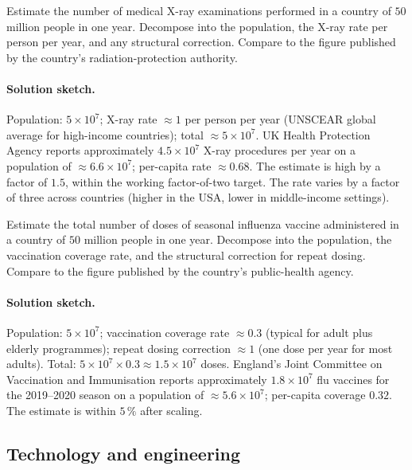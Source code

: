 \begin{exercise}
Estimate the number of medical X-ray examinations performed in a
country of $50$ million people in one year. Decompose into the
population, the X-ray rate per person per year, and any structural
correction. Compare to the figure published by the country's
radiation-protection authority.
\end{exercise}

\paragraph{Solution sketch.}
Population: $5 \times 10^{7}$; X-ray rate $\approx 1$ per person
per year (UNSCEAR global average for high-income countries); total
$\approx 5 \times 10^{7}$. UK Health Protection Agency reports
approximately $4.5 \times 10^{7}$ X-ray procedures per year on a
population of $\approx 6.6 \times 10^{7}$; per-capita rate
$\approx 0.68$. The estimate is high by a factor of $1.5$, within
the working factor-of-two target. The rate varies by a factor of
three across countries (higher in the USA, lower in middle-income
settings).

\begin{exercise}
Estimate the total number of doses of seasonal influenza vaccine
administered in a country of $50$ million people in one year.
Decompose into the population, the vaccination coverage rate, and
the structural correction for repeat dosing. Compare to the figure
published by the country's public-health agency.
\end{exercise}

\paragraph{Solution sketch.}
Population: $5 \times 10^{7}$; vaccination coverage rate $\approx
0.3$ (typical for adult plus elderly programmes); repeat dosing
correction $\approx 1$ (one dose per year for most adults). Total:
$5 \times 10^{7} \times 0.3 \approx 1.5 \times 10^{7}$ doses.
England's Joint Committee on Vaccination and Immunisation reports
approximately $1.8 \times 10^{7}$ flu vaccines for the 2019--2020
season on a population of $\approx 5.6 \times 10^{7}$; per-capita
coverage $0.32$. The estimate is within $5\,\%$ after scaling.

\subsection*{Technology and engineering}

